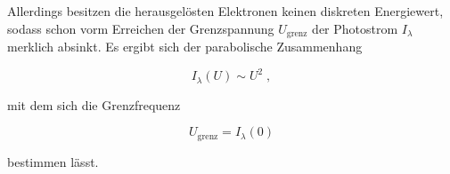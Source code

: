  Allerdings besitzen die herausgelösten Elektronen keinen diskreten Energiewert, sodass
 schon vorm Erreichen der Grenzspannung $U_\text{grenz}$ der Photostrom $I_\lambda$ merklich absinkt.
 Es ergibt sich der parabolische Zusammenhang 

 \begin{equation}
     I_\lambda(U) \sim U^2 \; ,
     \label{eqn:photostrom}
 \end{equation}

mit dem sich die Grenzfrequenz

\begin{equation}
    U_\text{grenz} = I_\lambda(0)
\end{equation}

bestimmen lässt.


  





